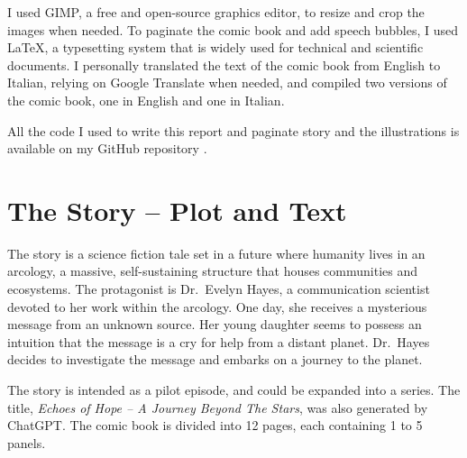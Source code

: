 \documentclass[a4paper,11pt]{article}
\begin{document}
I used GIMP, a free and open-source graphics editor, to resize and crop the images when needed. To paginate the comic book and add speech bubbles, I used \LaTeX, a typesetting system that is widely used for technical and scientific documents. I personally translated the text of the comic book from English to Italian, relying on Google Translate when needed, and compiled two versions of the comic book, one in English and one in Italian. 

All the code I used to write this report and paginate story and the illustrations is available on my GitHub repository \cite{github}.



\section{The Story -- Plot and Text}

The story is a science fiction tale set in a future where humanity lives in an arcology, a massive, self-sustaining structure that houses communities and ecosystems. The protagonist is Dr.~Evelyn Hayes, a communication scientist devoted to her work within the arcology. One day, she receives a mysterious message from an unknown source. Her young daughter seems to possess an intuition that the message is a cry for help from a distant planet. Dr.~Hayes decides to investigate the message and embarks on a journey to the planet. 

The story is intended as a pilot episode, and could be expanded into a series. The title, \emph{Echoes of Hope -- A Journey Beyond The Stars}, was also generated by ChatGPT. The comic book is divided into 12 pages, each containing 1 to 5 panels.
\end{document}
